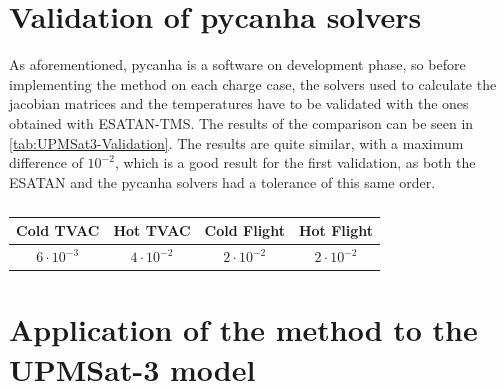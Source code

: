     \section{Validation of pycanha solvers}
    As aforementioned, pycanha is a software on development phase, so before implementing the method on each charge case, the solvers used to calculate the jacobian matrices and the temperatures have to be validated with the ones obtained with ESATAN-TMS. The results of the comparison can be seen in \autoref{tab:UPMSat3-Validation}. The results are quite similar, with a maximum difference of $10^{-2}$, which is a good result for the first validation, as both the ESATAN and the pycanha solvers had a tolerance of this same order.
    \begin{table}[H]
    \centering
    \caption{}
    \begin{tabular}{c c c c}
        \toprule
        \textbf{Cold TVAC} & \textbf{Hot TVAC} & \textbf{Cold Flight} & \textbf{Hot Flight} \\
        \midrule
        $6\cdot 10^{-3}$ & $4\cdot 10^{-2}$ & $2\cdot 10^{-2}$ & $2\cdot 10^{-2}$ \\
        \bottomrule
    \end{tabular}
    \end{table}

    \section{Application of the method to the UPMSat-3 model}

